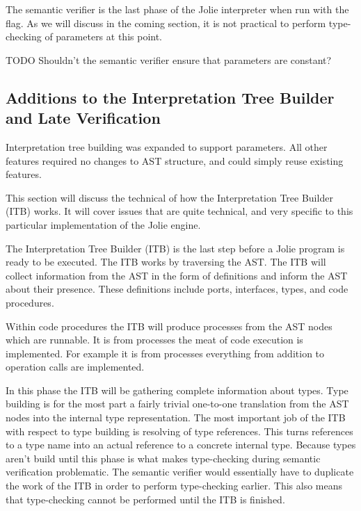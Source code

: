 The semantic verifier is the last phase of the Jolie interpreter when run with
the  flag. As we will discuss in the coming section, it is not
practical to perform type-checking of parameters at this point.

TODO Shouldn't the semantic verifier ensure that parameters are constant?

\subsection{Additions to the Interpretation Tree Builder and Late Verification}


Interpretation tree building was expanded to support parameters. All other
features required no changes to AST structure, and could simply reuse existing
features.

This section will discuss the technical of how the Interpretation Tree Builder
(ITB) works. It will cover issues that are quite technical, and very specific
to this particular implementation of the Jolie engine.


The Interpretation Tree Builder (ITB) is the last step before a Jolie program
is ready to be executed. The ITB works by traversing the AST. The ITB will
collect information from the AST in the form of definitions and inform the AST
about their presence. These definitions include ports, interfaces, types, and
code procedures.


Within code procedures the ITB will produce processes from the AST nodes which
are runnable. It is from processes the meat of code execution is implemented.
For example it is from processes everything from addition to operation calls
are implemented.


In this phase the ITB will be gathering complete information about types. Type
building is for the most part a fairly trivial one-to-one translation from the
AST nodes into the internal type representation. The most important job of the
ITB with respect to type building is resolving of type references. This turns
references to a type name into an actual reference to a concrete internal type.
Because types aren't build until this phase is what makes type-checking during
semantic verification problematic. The semantic verifier would essentially have
to duplicate the work of the ITB in order to perform type-checking earlier.
This also means that type-checking cannot be performed until the ITB is
finished.

